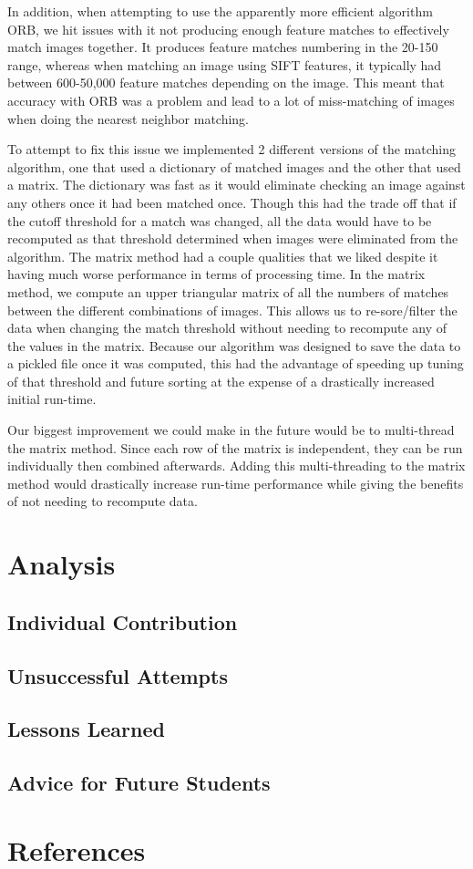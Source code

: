 \documentclass[12pt]{article}
\begin{document}
	In addition, when attempting to use the apparently more efficient algorithm ORB, we hit issues with it not producing enough feature matches to effectively match images together. It produces feature matches numbering in the 20-150 range, whereas when matching an image using SIFT features, it typically had between 600-50,000 feature matches depending on the image. This meant that accuracy with ORB was a problem and lead to a lot of miss-matching of images when doing the nearest neighbor matching.

	To attempt to fix this issue we implemented 2 different versions of the matching algorithm, one that used a dictionary of matched images and the other that used a matrix. The dictionary was fast as it would eliminate checking an image against any others once it had been matched once. Though this had the trade off that if the cutoff threshold for a match was changed, all the data would have to be recomputed as that threshold determined when images were eliminated from the algorithm. The matrix method had a couple qualities that we liked despite it having much worse performance in terms of processing time. In the matrix method, we compute an upper triangular matrix of all the numbers of matches between the different combinations of images. This allows us to re-sore/filter the data when changing the match threshold without needing to recompute any of the values in the matrix. Because our algorithm was designed to save the data to a pickled file once it was computed, this had the advantage of speeding up tuning of that threshold and future sorting at the expense of a drastically increased initial run-time. 
	
	Our biggest improvement we could make in the future would be to multi-thread the matrix method. Since each row of the matrix is independent, they can be run individually then combined afterwards. Adding this multi-threading to the matrix method would drastically increase run-time performance while giving the benefits of not needing to recompute data.
	
	
	
\section{Analysis}

\subsection{Individual Contribution}


\subsection{Unsuccessful Attempts}
	

\subsection{Lessons Learned}
	


\subsection{Advice for Future Students}

\section*{References}
\end{document}
